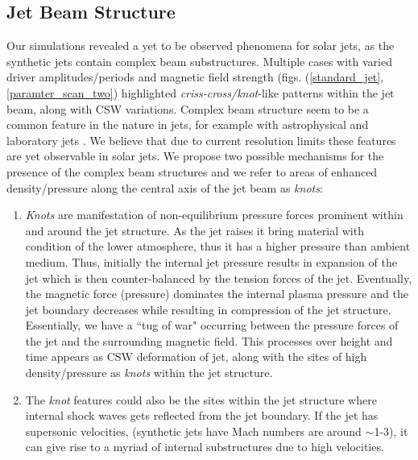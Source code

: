 \documentclass[12pt]{ociamthesis}
\begin{document}
\subsection{Jet Beam Structure}
\label{subsec:j_beam_struc}
Our simulations revealed a yet to be observed phenomena for solar jets, as the synthetic jets contain complex beam substructures. Multiple cases with varied driver amplitudes/periods and magnetic field strength (figs. (\ref{standard_jet}, \ref{paramter_scan_two}) highlighted \textit{criss-cross/knot}-like patterns within the jet beam, along with CSW variations. Complex beam structure seem to be a common feature in the nature in jets, for example with astrophysical \citep{van_Putten_1996ApJ467L57V, DeGouveiaDalPino2005, Hada2013ApJ77570H, Cohen2014ApJ787151C, Hervet2017AnA606A103H} and laboratory jets \citep{Menon2010, Edgington-Mitchell2014, Ono2014}. We believe that due to current resolution limits these features are yet observable in solar jets. We propose two possible mechanisms for the presence of the complex beam structures and we refer to areas of enhanced density/pressure along the central axis of the jet beam as \textit{knots}:
\begin{enumerate}
\item{\textit{Knots} are manifestation of non-equilibrium pressure forces prominent within and around the jet structure. As the jet raises it bring material with condition of the lower atmosphere, thus it has a higher pressure than ambient medium. Thus, initially the internal jet pressure results in expansion of the jet which is then counter-balanced by the tension forces of the jet. Eventually, the magnetic force (pressure) dominates the internal plasma pressure and the jet boundary decreases while resulting in compression of the jet structure. Essentially, we have a ``tug of war" occurring between the pressure forces of the jet and the surrounding magnetic field. This processes over height and time appears as CSW deformation of jet, along with the sites of high density/pressure as \textit{knots} within the jet structure.}
\item{The \textit{knot} features could also be the sites within the jet structure where internal shock waves \citep{Norman1982} gets reflected from the jet boundary. If the jet has supersonic velocities,  (synthetic jets have Mach numbers are around $\sim$1-3), it can give rise to a myriad of internal substructures due to high velocities.}
\end{enumerate}
\end{document}

